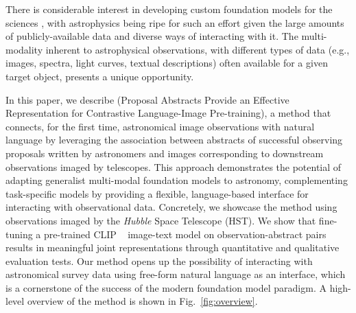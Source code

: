 \documentclass{article} %
\newcommand{\hubble}{\emph{Hubble}\xspace}
\newcommand{\changes}[1]{#1}
\begin{document}
There is considerable interest in developing custom foundation models for the sciences \citep[e.g., ][]{batatia2023foundation,subramanian2023towards,mccabe2023multiple,Birk:2024knn,vig2024finetuning,heinrich2024masked}, with astrophysics being ripe for such an effort given the large amounts of publicly-available data and diverse ways of interacting with it.
%
The multi-modality inherent to astrophysical observations, with different types of data (e.g., images, spectra, light curves, textual descriptions) often available for a given target object, presents a unique opportunity.
%

In this paper, we describe  (Proposal Abstracts Provide an Effective Representation for Contrastive Language-Image Pre-training),
a method that connects, for the first time, astronomical image observations with natural language by leveraging the association between abstracts of successful observing proposals written by astronomers and images corresponding to downstream observations imaged by telescopes. 
%
\changes{This approach demonstrates the potential of adapting generalist multi-modal foundation models to astronomy, complementing task-specific models by providing a flexible, language-based interface for interacting with observational data.}
%
Concretely, we showcase the method using observations imaged by the \hubble Space Telescope (HST).
%
We show that fine-tuning a pre-trained CLIP ~\citep[Contrastive Language-Image Pre-training; ][]{radford2021learning} image-text model on observation-abstract pairs results in meaningful joint representations through quantitative and qualitative evaluation tests.
%
Our method opens up the possibility of interacting with astronomical survey data using free-form natural language as an interface, which is a cornerstone of the success of the modern foundation model paradigm. A high-level overview of the method is shown in Fig.~\ref{fig:overview}.
%
\end{document}

